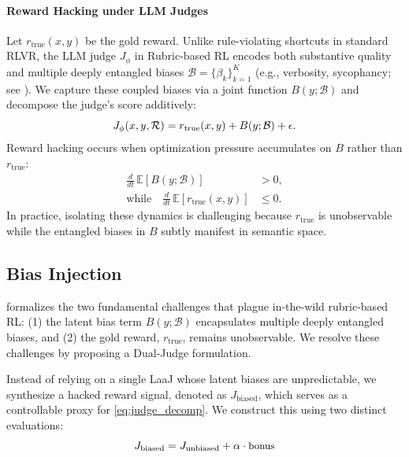 \documentclass{llmxive}
\begin{document}
\paragraph{Reward Hacking under LLM Judges}
\label{subsec:hacking_definition}
Let $r_{\text{true}}(x, y)$ be the gold reward. Unlike rule-violating shortcuts in standard RLVR, the LLM judge $J_\phi$ in Rubric-based RL encodes both substantive quality and multiple deeply entangled biases $\mathcal{B} = \{\beta_k\}_{k=1}^K$ (e.g., verbosity, sycophancy; see \citet{liGenerationJudgment2024, chenHumansLLMsJudge2024, yeJusticePrejudice2024}). We capture these coupled biases via a joint function $B(y; \mathcal{B})$ and decompose the judge's score additively:
\begin{equation}
\small
    J_\phi(x, y, \mathcal{R}) = r_{\text{true}}(x, y) + B(y; \mathcal{B}) + \epsilon.
    \label{eq:judge_decomp}
\end{equation}
Reward hacking occurs when optimization pressure accumulates on $B$ rather than $r_{\text{true}}$:{
\small
\begin{align*}
    \tfrac{d}{dt}\, \mathbb{E}[B(y; \mathcal{B})] &> 0, \\
    \text{while} \quad \tfrac{d}{dt}\, \mathbb{E}[r_{\text{true}}(x, y)] &\le 0.
\end{align*}}
In practice, isolating these dynamics is challenging because $r_{\text{true}}$ is unobservable while the entangled biases in $B$ subtly manifest in semantic space. 

\subsection{Bias Injection}
\label{subsec:reward_design}
 formalizes the two fundamental challenges that plague in-the-wild rubric-based RL: (1) the latent bias term $B(y; \mathcal{B})$ encapsulates multiple deeply entangled biases, and (2) the gold reward, $r_{\text{true}}$, remains unobservable. We resolve these challenges by proposing a Dual‑Judge formulation.

Instead of relying on a single LaaJ whose latent biases are unpredictable, we synthesize a hacked reward signal, denoted as $J_{\text{biased}}$, which serves as a controllable proxy for \cref{eq:judge_decomp}. We construct this using two distinct evaluations:
\begin{equation}
\small
    J_{\text{biased}} = J_{\text{unbiased}} + \alpha \cdot \text{bonus}
    \label{eq:dual_judge}
\end{equation}
\end{document}
